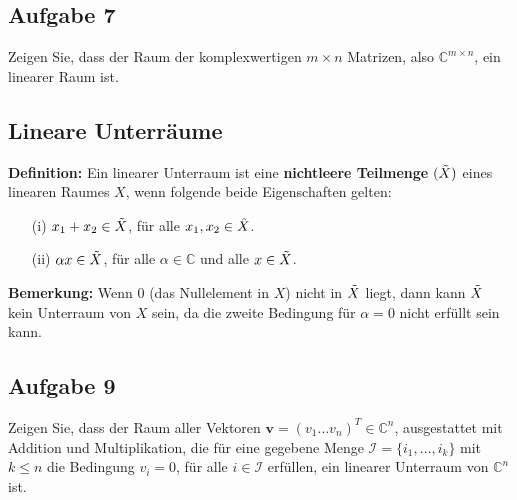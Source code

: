 \documentclass[11pt]{article}
\begin{document}
\subsection*{Aufgabe 7}
\vspace*{-0.5cm}
Zeigen Sie, dass der Raum der komplexwertigen $m\times n$ Matrizen, also $\mathbb{C}^{m\times n}$, ein linearer Raum ist.


\pagebreak

\subsection*{Lineare Unterräume}
\vspace*{-0.5cm}
\textbf{Definition:} Ein linearer Unterraum ist eine \textbf{nichtleere Teilmenge} $(\Tilde{X})$ eines linearen Raumes $X$, wenn folgende beide Eigenschaften gelten:
\vspace*{-0.5cm}
\begin{itemize}
    \item[(i)] $x_1 + x_2 \in \Tilde{X}$, für alle $x_1, x_2 \in \Tilde{X}$.
    \item[(ii)] $\alpha x \in \Tilde{X}$, für alle $\alpha \in \mathbb{C}$ und alle $x\in \Tilde{X}$.
\end{itemize}
\vspace*{-0.5cm}
\textbf{Bemerkung:} Wenn $0$ (das Nullelement in $X$) nicht in $\Tilde{X}$ liegt, dann kann $\Tilde{X}$ kein Unterraum von $X$ sein, da die zweite Bedingung für $\alpha = 0$ nicht erfüllt sein kann.

\vspace*{-0.5cm}
\subsection*{Aufgabe 9}
\vspace*{-0.5cm}
Zeigen Sie, dass der Raum aller Vektoren $\mathbf{v} = (v_1 \dots v_n)^T \in \mathbb{C}^n$, ausgestattet mit Addition und Multiplikation, die für eine gegebene Menge $\mathcal{I} = \{ i_1, \dots, i_k\}$ mit $k\leq n$ die Bedingung $v_i = 0$, für alle $i\in \mathcal{I}$ erfüllen, ein linearer Unterraum von $\mathbb{C}^n$ ist.
\end{document}
